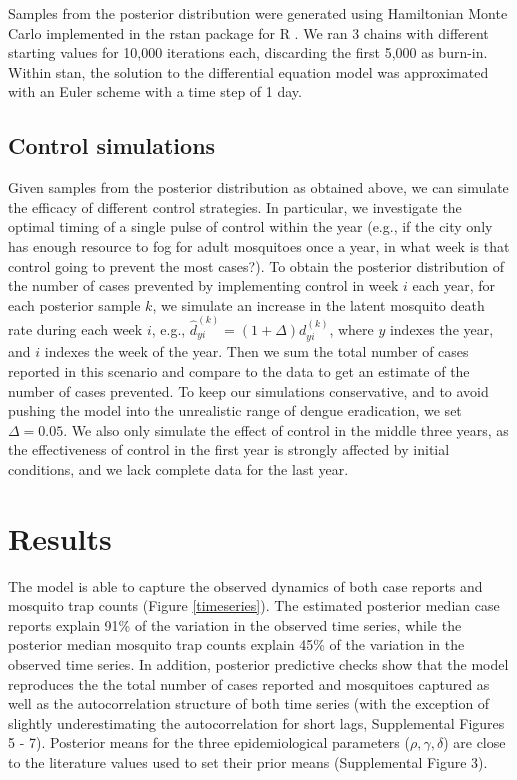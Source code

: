 \documentclass[10pt,letterpaper]{article}
\begin{document}
Samples from the posterior distribution were generated using Hamiltonian Monte Carlo implemented in the rstan package \cite{Carpenter2016, Rstan2017} for R \cite{R2016}. 
We ran 3 chains with different starting values for 10,000 iterations each, discarding the first 5,000 as burn-in.
Within stan, the solution to the differential equation model was approximated with an Euler scheme with a time step of 1 day.  

\subsection*{Control simulations}

Given samples from the posterior distribution as obtained above, we can simulate the efficacy of different control strategies.
In particular, we investigate the optimal timing of a single pulse of control within the year (e.g., if the city only has enough resource to fog for adult mosquitoes once a year, in what week is that control going to prevent the most cases?).
To obtain the posterior distribution of the number of cases prevented by implementing control in week $i$ each year, for each posterior sample $k$, we simulate an increase in the latent mosquito death rate during each week $i$, e.g.,
$\hat{d}^{(k)}_{yi} = (1 + \Delta) d^{(k)}_{yi}$, where $y$ indexes the year, and $i$ indexes the week of the year.
Then we sum the total number of cases reported in this scenario and compare to the data to get an estimate of the number of cases prevented.
To keep our simulations conservative, and to avoid pushing the model into the unrealistic range of dengue eradication, we set $\Delta = 0.05$.
We also only simulate the effect of control in the middle three years, as the effectiveness of control in the first year is strongly affected by initial conditions, and we lack complete data for the last year.

\section*{Results}

The model is able to capture the observed dynamics of both case reports and mosquito trap counts (Figure \ref{timeseries}).
The estimated posterior median case reports explain 91\% of the variation in the observed time series, while the posterior median mosquito trap counts explain 45\% of the variation in the observed time series. 
In addition, posterior predictive checks show that the model reproduces the the total number of cases reported and mosquitoes captured as well as the autocorrelation structure of both time series (with the exception of slightly underestimating the autocorrelation for short lags, Supplemental Figures 5 - 7).
Posterior means for the three epidemiological parameters ($\rho, \gamma, \delta$) are close to the literature values used to set their prior means (Supplemental Figure 3).
\end{document}
